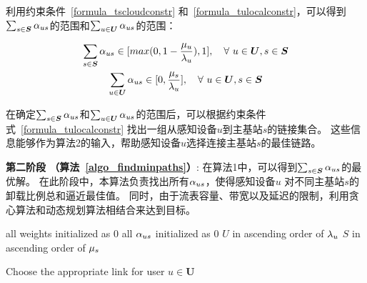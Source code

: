利用约束条件~\eqref{formula_tscloudconstr} 和~\eqref{formula_tulocalconstr}，可以得到$\sum_{s \in \boldsymbol{S}}{\alpha}_{us}$的范围和$\sum_{u \in \boldsymbol{U}}{\alpha}_{us}$的范围：

\vspace{-1em}

\begin{equation*}
\begin{gathered}
\sum_{s \in \boldsymbol{S}}{\alpha}_{us} \in [max(0, 1- \frac{{\mu}_{u}}{{\lambda}_{u}}), 1], \quad \forall\ u \in \boldsymbol{U}, s \in \boldsymbol{S}\\
\sum_{u \in \boldsymbol{U}}{\alpha}_{us} \in [0, \frac{{\mu}_{s}}{{\lambda}_{u}}], \quad \forall\ u \in \boldsymbol{U}, s \in \boldsymbol{S}
\end{gathered}
\end{equation*}

在确定$\sum_{s \in \boldsymbol{S}}{\alpha}_{us}$和$\sum_{u \in \boldsymbol{U}}{\alpha}_{us}$的范围后，可以根据约束条件式~\eqref{formula_tulocalconstr} 找出一组从感知设备$u$到主基站$s$的链接集合。
这些信息能够作为算法2的输入，帮助感知设备$u$选择连接主基站$s$的最佳链路。



\textbf{第二阶段 （算法~\ref{algo_findminpaths}）}:
在算法1中，可以得到$\sum_{s \in \boldsymbol{S}}{\alpha}_{us}$的最优解。
在此阶段中，本算法负责找出所有${\alpha}_{us}$，使得感知设备$u$ 对不同主基站$s$的卸载比例总和逼近最佳值。
同时，由于流表容量、带宽以及延迟的限制，利用贪心算法和动态规划算法相结合来达到目标。

\begin{algorithm}[h]
\setstretch{\algostretch}
all weights initialized as $0$
all ${\alpha}_{us}$ initialized as $0$
$U$ in ascending order of ${\lambda}_{u}$
$S$ in ascending order of ${\mu}_{s}$
\KwOut{$\xlus$}
\caption{Choose the appropriate link for user $u \in \boldsymbol{U}$}
\label{algo_findminpaths}
\end{algorithm}

